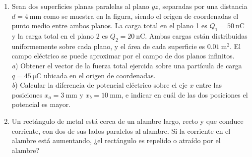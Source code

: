 \documentclass[a4paper,11pt,dvipsnames, twocolumn]{article}
\begin{document}
\begin{enumerate}[wide, labelwidth=!, labelindent=0pt]
\item Sean dos superficies planas paralelas al plano $yz$, separadas por una distancia $d=\SI{4}{\milli\metre}$ como se muestra en la figura, siendo el origen de coordenadas el punto medio entre ambos planos. La carga total en el plano 1 es $Q_1=\SI{50}{\nano\coulomb}$ y la carga total en el plano 2 es $Q_2=\SI{20}{\nano\coulomb}$. Ambas cargas están distribuidas uniformemente sobre cada plano, y el área de cada superficie es $\SI{0.01}{\metre^2}$. El campo eléctrico se puede aproximar por el campo de dos planos infinitos.\\
\textit{a}) Obtener el vector de la fuerza total ejercida sobre una partícula de carga $q=\SI{45}{\micro\coulomb}$ ubicada en el origen de coordenadas.\\
\textit{b}) Calcular la diferencia de potencial eléctrico sobre el eje $x$ entre las posiciones $x_a=\SI{3}{\milli\metre}$ y $x_b=\SI{10}{\milli\metre}$, e indicar en cuál de las dos posiciones el potencial es mayor.
\begin{center}
\end{center}


\item Un rectángulo de metal está cerca de un alambre largo, recto y que conduce corriente, con dos de sus lados paralelos al alambre. Si la corriente en el alambre está aumentando, ¿el rectángulo es repelido o atraído por el alambre?

\end{enumerate}

\end{document}
